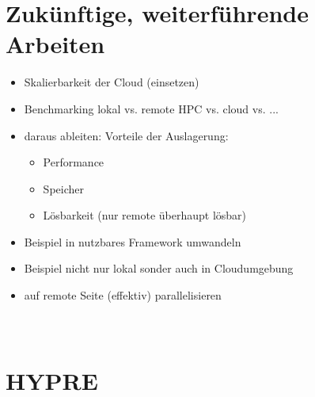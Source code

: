 \documentclass[a4paper,10pt]{article}
\numberwithin{figure}{section}
\numberwithin{table}{section}
\begin{document}
\newpage













\section{Zukünftige, weiterführende Arbeiten}


\begin{itemize}
 \item Skalierbarkeit der Cloud (einsetzen)
 \item Benchmarking lokal vs. remote HPC vs. cloud vs. ...
 \item daraus ableiten: Vorteile der Auslagerung:
  \begin{itemize}
    \item Performance
    \item Speicher
    \item Lösbarkeit (nur remote überhaupt lösbar)
  \end{itemize}
 \item Beispiel in nutzbares Framework umwandeln
 \item Beispiel nicht nur lokal sonder auch in Cloudumgebung
 \item auf remote Seite (effektiv) parallelisieren
\end{itemize}

\newpage











\newpage










\appendix
\section{\\HYPRE}
\end{document}

